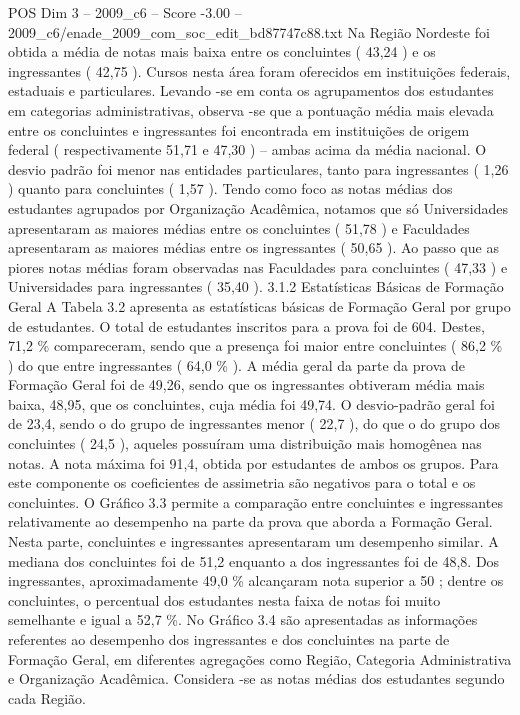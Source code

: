 \begin{textsample}{POS Dim 3 – 2009\_c6 – Score -3.00 – 2009\_c6/enade\_2009\_com\_soc\_edit\_bd87747c88.txt}
Na Região Nordeste foi obtida a média de notas mais baixa entre os concluintes ( 43,24 ) e os ingressantes ( 42,75 ).
Cursos nesta área foram oferecidos em instituições federais, estaduais e particulares.
Levando -se em conta os agrupamentos dos estudantes em categorias administrativas, observa -se que a pontuação média mais elevada entre os concluintes e ingressantes foi encontrada em instituições de origem federal ( respectivamente 51,71 e 47,30 ) – ambas acima da média nacional.
O desvio padrão foi menor nas entidades particulares, tanto para ingressantes ( 1,26 ) quanto para concluintes ( 1,57 ).
Tendo como foco as notas médias dos estudantes agrupados por Organização Acadêmica, notamos que só Universidades apresentaram as maiores médias entre os concluintes ( 51,78 ) e Faculdades apresentaram as maiores médias entre os ingressantes ( 50,65 ).
Ao passo que as piores notas médias foram observadas nas Faculdades para concluintes ( 47,33 ) e Universidades para ingressantes ( 35,40 ). 3.1.2 Estatísticas Básicas de Formação Geral A Tabela 3.2 apresenta as estatísticas básicas de Formação Geral por grupo de estudantes.
O total de estudantes inscritos para a prova foi de 604.
Destes, 71,2 \% compareceram, sendo que a presença foi maior entre concluintes ( 86,2 \% ) do que entre ingressantes ( 64,0 \% ).
A média geral da parte da prova de Formação Geral foi de 49,26, sendo que os ingressantes obtiveram média mais baixa, 48,95, que os concluintes, cuja média foi 49,74.
O desvio-padrão geral foi de 23,4, sendo o do grupo de ingressantes menor ( 22,7 ), do que o do grupo dos concluintes ( 24,5 ), aqueles possuíram uma distribuição mais homogênea nas notas.
A nota máxima foi 91,4, obtida por estudantes de ambos os grupos.
Para este componente os coeficientes de assimetria são negativos para o total e os concluintes.
O Gráfico 3.3 permite a comparação entre concluintes e ingressantes relativamente ao desempenho na parte da prova que aborda a Formação Geral.
Nesta parte, concluintes e ingressantes apresentaram um desempenho similar.
A mediana dos concluintes foi de 51,2 enquanto a dos ingressantes foi de 48,8.
Dos ingressantes, aproximadamente 49,0 \% alcançaram nota superior a 50 ; dentre os concluintes, o percentual dos estudantes nesta faixa de notas foi muito semelhante e igual a 52,7 \%.
No Gráfico 3.4 são apresentadas as informações referentes ao desempenho dos ingressantes e dos concluintes na parte de Formação Geral, em diferentes agregações como Região, Categoria Administrativa e Organização Acadêmica.
Considera -se as notas médias dos estudantes segundo cada Região.

\end{textsample}

